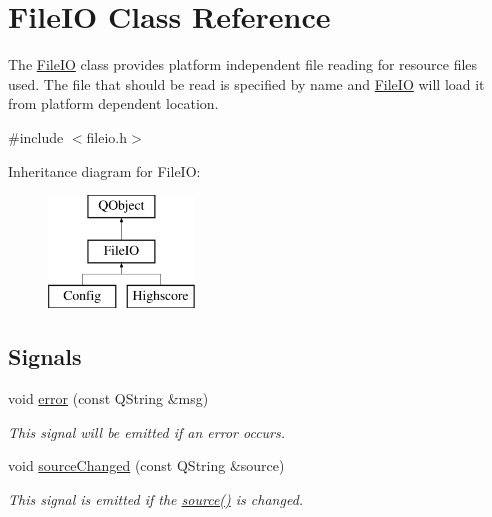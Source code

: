 \hypertarget{class_file_i_o}{\section{File\+I\+O Class Reference}
\label{class_file_i_o}
}


The \hyperlink{class_file_i_o}{File\+I\+O} class provides platform independent file reading for resource files used.  The file that should be read is specified by name and \hyperlink{class_file_i_o}{File\+I\+O} will load it from platform dependent location.  




{\ttfamily \#include $<$fileio.\+h$>$}

Inheritance diagram for File\+I\+O\+:\begin{figure}[H]
\begin{center}
\leavevmode
\includegraphics[height=3.000000cm]{class_file_i_o}
\end{center}
\end{figure}
\subsection*{Signals}
\begin{DoxyCompactItemize}
\item 
void \hyperlink{class_file_i_o_a4136bb085d530f9dd54eb849f14d58da}{error} (const Q\+String \&msg)
\begin{DoxyCompactList}\small\item\em This signal will be emitted if an error occurs. \end{DoxyCompactList}\item 
void \hyperlink{class_file_i_o_a31a6e00e907268e4473a0a826d2e6a1e}{source\+Changed} (const Q\+String \&source)
\begin{DoxyCompactList}\small\item\em This signal is emitted if the \hyperlink{class_file_i_o_a8da2b4c6cd72af512e4556203c1c66e7}{source()} is changed. \end{DoxyCompactList}\end{DoxyCompactItemize}
